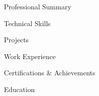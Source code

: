 


\begin{rSection}{Professional Summary}


\end{rSection}


\begin{rSection}{Technical Skills}


\end{rSection}


\begin{rSection}{Projects}


\end{rSection}


\begin{rSection}{Work Experience}


\end{rSection}


\begin{rSection}{Certifications \& Achievements}


\end{rSection}


\begin{rSection}{Education}


\end{rSection}


